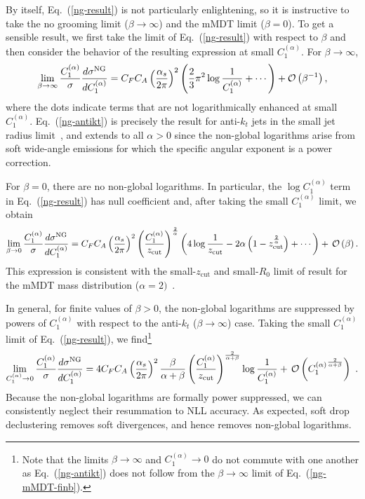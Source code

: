 \documentclass[letterpaper,11pt]{article}
\newcommand{\order}[1]{{\cal O}\left(#1\right)}
\newcommand{\C}[2]{C^{(#2)}_{#1}}
\newcommand{\zcut}{z_\text{cut}}
\newcommand{\ea}{{\C{1}{\alpha}}}
\DeclareRobustCommand{\Eq}[1]{Eq.~(\ref{#1})}
\DeclareRobustCommand{\order}[1]{{\cal O}(#1)}
\begin{document}
By itself, \Eq{ng-result} is not particularly enlightening, so it is instructive to take the no grooming limit ($\beta \to \infty$) and the mMDT limit ($\beta=0$). To get a sensible result, we first take the limit of \Eq{ng-result} with respect to $\beta$ and then consider the behavior of the resulting expression at small $\ea$.  For $\beta\to\infty$,
\begin{equation}\label{ng-antikt}
\lim_{\beta \to \infty}\frac{\ea}{\sigma}\frac{d \sigma^\text{NG}}{d \ea} =  C_F C_A \left ( \frac{\alpha_s}{2 \pi} \right)^2 \left( \frac{2}{3}\pi^2 \log \frac{1}{\ea} + \cdots \right) +\order{\beta^{-1}},
\end{equation}
where the dots indicate terms that are not logarithmically enhanced at small $\ea$.  \Eq{ng-antikt} is precisely the result for anti-$k_t$ jets in the small jet radius limit~\cite{BDKM}, and extends to all $\alpha > 0$ since the non-global logarithms arise from soft wide-angle emissions for which the specific angular exponent is a power correction.

For $\beta=0$, there are no non-global logarithms.  In particular, the $\log \ea$ term in \Eq{ng-result} has null coefficient and, after taking the small $\ea$ limit, we obtain
\begin{equation}\label{ng-mMDT}
\lim_{\beta \to 0}\frac{\ea}{\sigma}\frac{d \sigma^\text{NG}}{d \ea}=  C_F C_A \left ( \frac{\alpha_s}{2 \pi} \right)^2  \left(\frac{\ea}{\zcut} \right)^\frac{2}{\alpha}\left( 4 \log \frac{1}{\zcut}- 2\alpha \left(1-\zcut^\frac{2}{\alpha} \right) + \cdots \right) + \,\order{\beta}.
\end{equation}
This expression is consistent with the small-$\zcut$ and small-$R_0$ limit of result for the mMDT mass distribution ($\alpha=2)$~\cite{taggersNLO}.

In general, for finite values of $\beta > 0$, the non-global logarithms are suppressed by powers of $\ea$ with respect to the anti-$k_t$ ($\beta\to \infty$) case.  Taking the small $\ea$ limit of \Eq{ng-result}, we find\footnote{Note that the limits $\beta\to \infty$ and $\ea \to 0$ do not commute with one another as \Eq{ng-antikt} does not follow from the $\beta\to \infty$ limit of \Eq{ng-mMDT-finb}.}
\begin{equation}\label{ng-mMDT-finb}
\lim_{\ea \to 0}\frac{\ea}{\sigma}\frac{d \sigma^\text{NG}}{d \ea}=  4C_F C_A \left ( \frac{\alpha_s}{2 \pi} \right)^2 \frac{\beta}{\alpha+\beta}\left(  \frac{\ea}{\zcut} \right)^{\frac{2}{\alpha+\beta}} \log\frac{1}{\ea}+ \,{\cal O}\left(\ea^{\frac{2}{\alpha+\beta}}\right) \ .
\end{equation}
Because the non-global logarithms are formally power suppressed, we can consistently neglect their resummation to NLL accuracy.  As expected, soft drop declustering removes soft divergences, and hence removes non-global logarithms.
\end{document}
